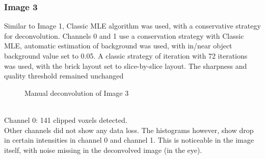 \documentclass{article}
\begin{document}
\subsubsection*{Image 3} 
Similar to Image 1, Classic MLE algorithm was used, with a conservative strategy for deconvolution. 
Channels 0 and 1 use a conservation strategy with Classic MLE, automatic estimation of background was used, with in/near object background value set to 0.05. A classic strategy of iteration with 72 iterations was used, with the brick layout set to slice-by-slice layout. The sharpness and quality threshold remained unchanged \newline
\begin{figure}[h!]
\centering
{}
\vspace{5 mm}
\caption{Manual deconvolution of Image 3}
\label{fig:manual-deconvolve-image3}
\end{figure}
\\ 
Channel 0: 141 clipped voxels detected.\\ Other channels did not show any data loss. The histograms however, show drop in certain intensities in channel 0 and channel 1. This is noticeable in the image itself, with noise missing in the deconvolved image (in the eye). 
\end{document}
